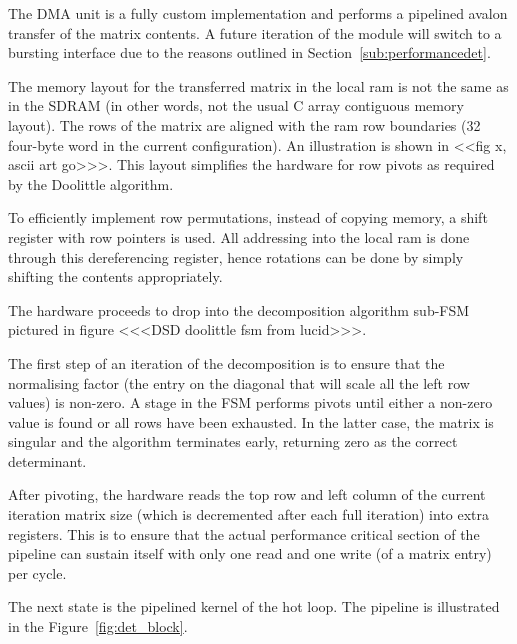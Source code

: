 \documentclass[]{article}
\begin{document}
The DMA unit is a fully custom implementation and performs a pipelined avalon transfer of the matrix contents. A future iteration of the module will switch to a bursting interface due to the reasons outlined in Section~\ref{sub:performancedet}. 

The memory layout for the transferred matrix in the local ram is not the same as in the SDRAM (in other words, not the usual C array contiguous memory layout). The rows of the matrix are aligned with the ram row boundaries (32 four-byte word in the current configuration).  An illustration is shown in <<fig x, ascii art go>>>. This layout simplifies the hardware for row pivots as required by the Doolittle algorithm.

To efficiently implement row permutations, instead of copying memory, a shift register with row pointers is used. All addressing into the local ram is done through this dereferencing register, hence rotations can be done by simply shifting the contents appropriately.

The hardware proceeds to drop into the decomposition algorithm sub-FSM pictured in figure <<<DSD doolittle fsm from lucid>>>.

The first step of an iteration of the decomposition is to ensure that the normalising factor (the entry on the diagonal that will scale all the left row values) is non-zero. A stage in the FSM performs pivots until either a non-zero value is found or all rows have been exhausted. In the latter case, the matrix is singular and the algorithm terminates early, returning zero as the correct determinant.

After pivoting, the hardware reads the top row and left column of the current iteration matrix size (which is decremented after each full iteration) into extra registers. This is to ensure that the actual performance critical section of the pipeline can sustain itself with only one read and one write (of a matrix entry) per cycle.

The next state is the pipelined kernel of the hot loop. The pipeline is illustrated in the Figure~\ref{fig:det_block}.
\end{document}
